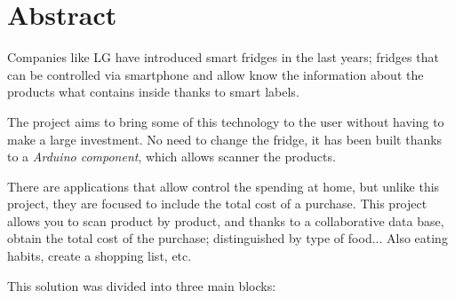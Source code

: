 \chapter*{Abstract}

Companies like LG have introduced smart fridges in the last years; fridges that can be controlled via smartphone and allow know the information about the products what contains inside thanks to smart labels.

The project aims to bring some of this technology to the user without having to make a large investment. No need to change the fridge, it has been built thanks to a \emph{Arduino component}, which allows scanner the products.

There are applications that allow control the spending at home, but unlike this project, they are focused to include the total cost of a purchase. This project allows you to scan product by product, and thanks to a collaborative data base, obtain the total cost of the purchase; distinguished by type of food... Also eating habits, create a shopping list, etc.

This solution was divided into three main blocks:

